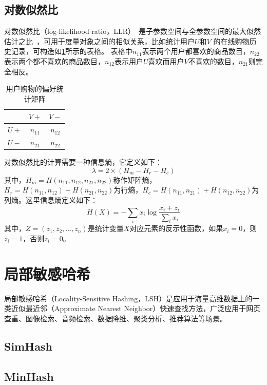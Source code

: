 \subsection{对数似然比}
对数似然比（log-likelihood ratio，LLR）~\cite{dunning1993accurate,wang2008multiple}是子参数空间与全参数空间的最大似然估计之比~\cite{dunning1993accurate}，可用于度量对象之间的相似关系，比如统计用户$U$和$V$ 的在线购物历史记录，可构造如\ref{tbl:llr}所示的表格。
表格中$n_{11}$表示两个用户都喜欢的商品数目，$n_{22}$表示两个都不喜欢的商品数目，$n_{12}$表示用户$U$喜欢而用户$V$不喜欢的数目，$n_{21}$则完全相反。
\begin{table}[htbp]
    \centering
    \begin{tabular}{c|c|c}
      \hline
       & $V+$ & $V-$ \\
      \hline
      $U+$ & $n_{11}$ & $n_{12}$ \\
      \hline
      $U-$ & $n_{21}$ & $n_{22}$ \\
      \hline
    \end{tabular}
    \caption{用户购物的偏好统计矩阵}
    \label{tbl:llr}
\end{table}

对数似然比的计算需要一种信息熵，它定义如下：
\begin{equation}\label{eq:llr}
    \lambda = 2 \times (H_m - H_r - H_c)
\end{equation}
其中，$H_m = H(n_{11}, n_{12}, n_{21}, n_{22})$称作矩阵熵，$H_r = H(n_{11}, n_{12}) + H(n_{21}, n_{22})$为行熵，$H_c = H(n_{11}, n_{21}) + H(n_{12}, n_{22})$为列熵。这里信息熵定义如下：
\begin{equation}
    H(X) = -\sum\limits_i x_i \log \frac{x_i + z_i}{\sum\limits_i x_i}
\end{equation}
其中，$Z=(z_1, z_2, \ldots, z_n)$是统计变量$X$对应元素的反示性函数，如果$x_i=0$，则$z_i=1$，否则$z_i=0$。

\section{局部敏感哈希}
局部敏感哈希（Locality-Sensitive Hashing，LSH）是应用于海量高维数据上的一类近似最近邻（Approximate Nearest Neighbor）快速查找方法，广泛应用于网页查重、图像检索、音频检索、数据降维、聚类分析、推荐算法等场景。

\subsection{SimHash}
\subsection{MinHash}


